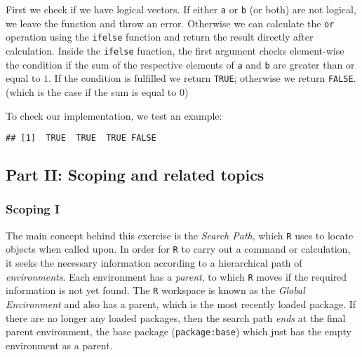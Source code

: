 \documentclass[11,]{article}
\newenvironment{Shaded}{\begin{snugshade}}{\end{snugshade}}
\newcommand{\KeywordTok}[1]{\textcolor[rgb]{0.13,0.29,0.53}{\textbf{{#1}}}}
\newcommand{\StringTok}[1]{\textcolor[rgb]{0.31,0.60,0.02}{{#1}}}
\newcommand{\OtherTok}[1]{\textcolor[rgb]{0.56,0.35,0.01}{{#1}}}
\newcommand{\NormalTok}[1]{{#1}}
\begin{document}
First we check if we have logical vectors. If either \texttt{a} or
\texttt{b} (or both) are not logical, we leave the function and throw an
error. Otherwise we can calculate the \texttt{or} operation using the
\texttt{ifelse} function and return the result directly after
calculation. Inside the \texttt{ifelse} function, the first argument
checks element-wise the condition if the sum of the respective elements
of \texttt{a} and \texttt{b} are greater than or equal to \(1\). If the
condition is fulfilled we return \texttt{TRUE}; otherwise we return
\texttt{FALSE}. (which is the case if the sum is equal to \(0\))

To check our implementation, we test an example:

\begin{Shaded}
\end{Shaded}

\begin{verbatim}
## [1]  TRUE  TRUE  TRUE FALSE
\end{verbatim}

\subsection{Part II: Scoping and related
topics}\label{part-ii-scoping-and-related-topics}

\subsubsection{Scoping I}\label{scoping-i}

The main concept behind this exercise is the \emph{Search Path}, which
\texttt{R} uses to locate objects when called upon. In order for
\texttt{R} to carry out a command or calculation, it seeks the necessary
information according to a hierarchical path of \emph{environments}.
Each environment has a \emph{parent}, to which \texttt{R} moves if the
required information is not yet found. The \texttt{R} workspace is known
as the \emph{Global Environment} and also has a parent, which is the
most recently loaded package. If there are no longer any loaded
packages, then the search path \emph{ends} at the final parent
environment, the base package (\texttt{package:base}) which just has the
empty environment as a parent.
\end{document}
